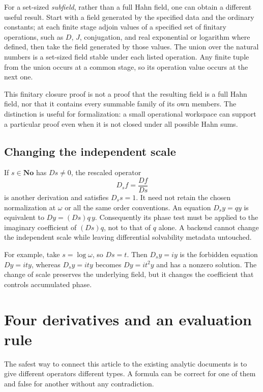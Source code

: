 \documentclass[11pt,a4paper]{article}
\numberwithin{equation}{section}
\theoremstyle{definition}
\theoremstyle{remark}
\newcommand{\No}{\mathbf{No}}
\begin{document}
For a set-sized \emph{subfield}, rather than a full Hahn field, one can
obtain a different useful result. Start with a field generated by the
specified data and the ordinary constants; at each finite stage adjoin
values of a specified set of finitary operations, such as $D$, $J$,
conjugation, and real exponential or logarithm where defined, then take the
field generated by those values. The union over the natural numbers is a
set-sized field stable under each listed operation. Any finite tuple from
the union occurs at a common stage, so its operation value occurs at the
next one.

This finitary closure proof is not a proof that the resulting field is a
full Hahn field, nor that it contains every summable family of its own
members. The distinction is useful for formalization: a small operational
workspace can support a particular proof even when it is not closed under
all possible Hahn sums.

\subsection{Changing the independent scale}

If $s\in\No$ has $Ds\ne0$, the rescaled operator
\[
 D_s f=\frac{Df}{Ds}
\]
is another derivation and satisfies $D_s s=1$. It need not retain the
chosen normalization at $\omega$ or all the same order conventions.
An equation $D_s y=qy$ is equivalent to $Dy=(Ds)q\,y$.
Consequently its phase test must be applied to the imaginary coefficient of
$(Ds)q$, not to that of $q$ alone. A backend cannot change the independent
scale while leaving differential solvability metadata untouched.

For example, take $s=\log\omega$, so $Ds=t$. Then $D_s y=iy$ is the
forbidden equation $Dy=ity$, whereas $D_sy=it y$ becomes
$Dy=it^2y$ and has a nonzero solution. The change of scale preserves the
underlying field, but it changes the coefficient that controls accumulated
phase.

\section{Four derivatives and an evaluation rule}
\label{sec:derivatives}

The safest way to connect this article to the existing analytic documents
is to give different operators different types. A formula can be correct
for one of them and false for another without any contradiction.
\end{document}
